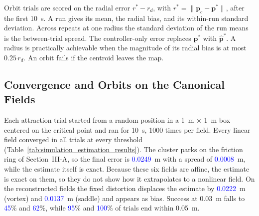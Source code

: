 \documentclass[lettersize,journal]{IEEEtran}
\newcommand{\rev}[1]{\textcolor{blue}{#1}}           %
\begin{document}
Orbit trials are scored on the radial error $r^* - r_d$, with $r^* = \|\mathbf{p}_c - \mathbf{p}^*\|$, after the first 10~s. A run gives its mean, the radial bias, and its within-run standard deviation. Across repeats at one radius the standard deviation of the run means is the between-trial spread. The controller-only error replaces $\mathbf{p}^*$ with $\hat{\mathbf{p}}^*$. A radius is practically achievable when the magnitude of its radial bias is at most $0.25\,r_d$. An orbit fails if the centroid leaves the map.

\subsection{Convergence and Orbits on the Canonical Fields}

Each attraction trial started from a random position in a 1~m $\times$ 1~m box centered on the critical point and ran for 10~s, 1000 times per field. Every linear field converged in all trials at every threshold (Table~\ref{tab:simulation_estimation_results}). The cluster parks on the friction ring of Section~III-A, so the final error is \rev{0.0249}~m with a spread of \rev{0.0008}~m, while the estimate itself is exact. Because these six fields are affine, the estimate is exact on them, so they do not show how it extrapolates to a nonlinear field. On the reconstructed fields the fixed distortion displaces the estimate by \rev{0.0222}~m (vortex) and \rev{0.0137}~m (saddle) and appears as bias. Success at 0.03~m falls to \rev{45}\% and \rev{62}\%, while \rev{95}\% and \rev{100}\% of trials end within 0.05~m. %
\end{document}
